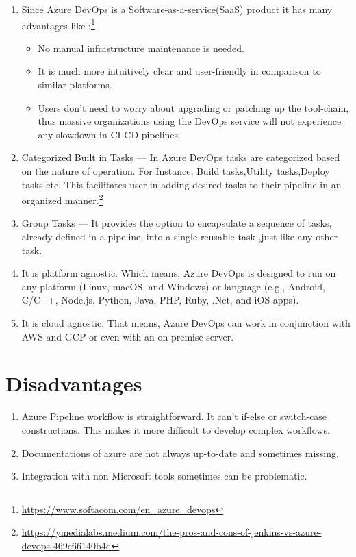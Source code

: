 \documentclass{article}
\begin{document}
\begin{enumerate}
   \item Since Azure DevOps is a Software-as-a-service(SaaS) product it has many advantages like :\footnote{\url{https://www.softacom.com/en_azure_devops}}
   \begin{itemize}
     \item No manual infrastructure maintenance is needed. 
     \item It is much more intuitively clear and user-friendly in comparison to similar platforms.
     \item Users don’t need to worry about upgrading or patching up the tool-chain, thus massive organizations using the DevOps service will not experience any slowdown in CI-CD pipelines.
   \end{itemize}
   \item Categorized Built in Tasks — In Azure DevOps tasks are categorized based on the nature of operation. For Instance, Build tasks,Utility tasks,Deploy tasks etc. This facilitates user in adding desired tasks to their pipeline in an organized manner.\footnote{\url{https://ymedialabs.medium.com/the-pros-and-cons-of-jenkins-vs-azure-devops-469c66140b4d}}
   \item Group Tasks — It provides the option to encapsulate a sequence of tasks, already defined in a pipeline, into a single reusable task ,just like any other task.
   \item  It is platform agnostic. Which means, Azure DevOps is designed to run on any platform (Linux, macOS, and Windows) or language (e.g., Android, C/C++, Node.js, Python, Java, PHP, Ruby, .Net, and iOS apps).
   \item It is cloud agnostic. That means, Azure DevOps can  work in conjunction with AWS and GCP or even with an on-premise server. 
\end{enumerate}


\section{Disadvantages}

\begin{enumerate}
    \item Azure Pipeline workflow is straightforward. It can’t if-else or switch-case constructions. This makes it more difficult to develop complex workflows.
    \item Documentations of azure are not always up-to-date and sometimes missing.
    \item Integration with non Microsoft tools sometimes can be problematic. 
\end{enumerate}
\end{document}
